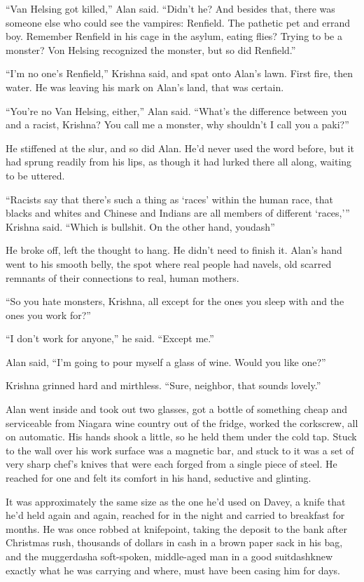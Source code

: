 ``Van Helsing got killed,'' Alan said.  ``Didn't he?  And besides
that, there was someone else who could see the vampires:  Renfield. 
The pathetic pet and errand boy.  Remember Renfield in his cage in the
asylum, eating flies?  Trying to be a monster?  Von Helsing recognized
the monster, but so did Renfield.''

``I'm no one's Renfield,'' Krishna said, and spat onto Alan's lawn. 
First fire, then water.  He was leaving his mark on Alan's land, that
was certain.

``You're no Van Helsing, either,'' Alan said.  ``What's the difference
between you and a racist, Krishna?  You call me a monster, why
shouldn't I call you a paki?''

He stiffened at the slur, and so did Alan.  He'd never used the word
before, but it had sprung readily from his lips, as though it had
lurked there all along, waiting to be uttered.

``Racists say that there's such a thing as `races' within the human
race, that blacks and whites and Chinese and Indians are all members
of different `races,''' Krishna said.  ``Which is bullshit.  On the
other hand, youdash{}''

He broke off, left the thought to hang.  He didn't need to finish it. 
Alan's hand went to his smooth belly, the spot where real people had
navels, old scarred remnants of their connections to real, human
mothers.

``So you hate monsters, Krishna, all except for the ones you sleep
with and the ones you work for?''

``I don't work for anyone,'' he said.  ``Except me.''

Alan said, ``I'm going to pour myself a glass of wine.  Would you like
one?''

Krishna grinned hard and mirthless.  ``Sure, neighbor, that sounds
lovely.''

Alan went inside and took out two glasses, got a bottle of something
cheap and serviceable from Niagara wine country out of the fridge,
worked the corkscrew, all on automatic.  His hands shook a little, so
he held them under the cold tap.  Stuck to the wall over his work
surface was a magnetic bar, and stuck to it was a set of very sharp
chef's knives that were each forged from a single piece of steel.  He
reached for one and felt its comfort in his hand, seductive and
glinting.

It was approximately the same size as the one he'd used on Davey, a
knife that he'd held again and again, reached for in the night and
carried to breakfast for months.  He was once robbed at knifepoint,
taking the deposit to the bank after Christmas rush, thousands of
dollars in cash in a brown paper sack in his bag, and the muggerdash{}a
soft-spoken, middle-aged man in a good suitdash{}knew exactly what he was
carrying and where, must have been casing him for days.

